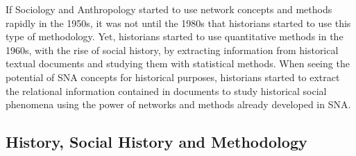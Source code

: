 If Sociology and Anthropology started to use network concepts and methods rapidly in the 1950s, it was not until the 1980s that historians started to use this type of methodology.
Yet, historians started to use quantitative methods in the 1960s, with the rise of social history, by extracting information from historical textual documents and studying them with statistical methods.
When seeing the potential of SNA concepts for historical purposes, historians started to extract the relational information contained in documents to study historical social phenomena using the power of networks and methods already developed in SNA.


\subsection{History, Social History and Methodology}\label{subsec:history-and-social-history}

